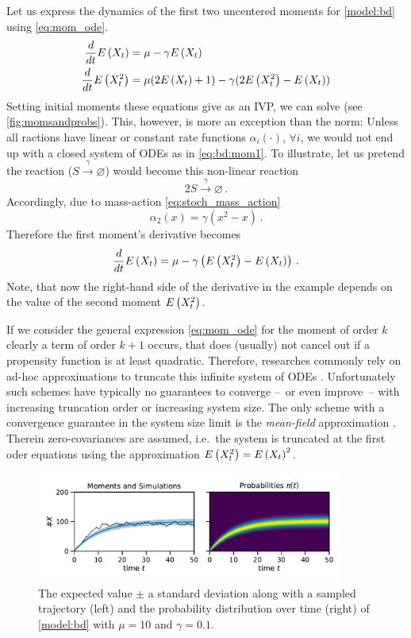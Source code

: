 \begin{example} Let us express the dynamics of the first two uncentered moments for \autoref{model:bd} using \eqref{eq:mom_ode}.
\begin{equation}\label{eq:bd:mom1}
	\begin{split}
	\frac{d}{dt}\E{X_t} =\; &\mu - \gamma \E{X_t}\\
	\frac{d}{dt}\E{X_t^2} =\; &\mu(2\E{X_t} + 1) - \gamma (2\E{X_t^2}-\E{X_t})%
	\end{split}
\end{equation}
Setting initial moments these equations give as an \ac{IVP}, we can solve (see \autoref{fig:momsandprobs}).
This, however, is more an exception than the norm:
Unless all ractions have linear or constant rate functions $\alpha_i(\cdot)$, $\forall i$, we would not end up with a closed system of \acp{ODE} as in \eqref{eq:bd:mom1}.
To illustrate, let us pretend the reaction ($S\xrightarrow{\gamma}\varnothing$) would become this non-linear reaction
$$
2S\xrightarrow{\gamma}\varnothing\,.
$$
Accordingly, due to mass-action \eqref{eq:stoch_mass_action}
$$
\alpha_2(x)=\gamma (x^2 - x)\,.
$$
Therefore the first moment's derivative becomes
$$
\frac{d}{dt}{E}\left(X_t\right) =\mu - \gamma \left({E}\left(X_t^2\right) - {E}\left(X_t\right)\right)\,.
$$
Note, that now the right-hand side of the derivative in the example depends on the value of the second moment ${E}\left(X_t^2\right)$.
\end{example}
If we consider the general expression \eqref{eq:mom_ode} for the moment of order $k$ clearly a term of order $k+1$ occurs, that does (usually) not cancel out if a propensity function is at least
quadratic.
Therefore, researches commonly rely on ad-hoc approximations to truncate this infinite system of \acp{ODE} \cite{hespanha2008moment,schnoerr2015,schnoerr2014validity}.
Unfortunately such schemes have typically no guarantees to converge --~or even improve~-- with increasing truncation order \cite{schnoerr2014validity} or increasing system size.
The only scheme with a convergence guarantee in the system size limit is the \emph{mean-field} approximation \cite{bortolussi2013continuous}.
Therein zero-covariances are assumed, i.e.\ the system is truncated at the first oder equations using the approximation ${E}\left(X_t^2\right)={E}\left(X_t\right)^2$.
\begin{figure}[htb]
	\centering
	\includegraphics[width=0.9\textwidth]{gfx/momsandprobs.pdf}
	\caption[Moments and probability distribution $\pi(t)$]{\label{fig:momsandprobs}The expected value $\pm$ a standard deviation along with a sampled trajectory (left) and the probability distribution over time (right) of \autoref{model:bd} with $\mu=10$ and $\gamma=0.1$.}
\end{figure}

